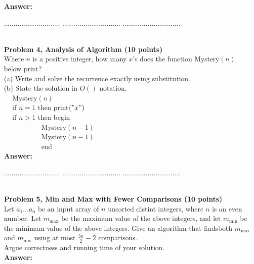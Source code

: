 \documentclass{article}
\begin{document}
\noindent
{\bf Answer:}

\pagebreak
{} $.............................$
 $..............................$
          $..............................$

\noindent
{}\\


\medskip\noindent
{\bf Problem 4, Analysis of Algorithm (10 points)}\\
Where $n$ is a positive integer,  how many $x$'s does the function Mystery$(n)$ below print?\\
(a) Write and solve the recurrence exactly using substitution.\\
(b) State the solution in $O()$ notation. \\
$~~~~$ Mystery$(n)$\\
$~~~~$ if $n=1$ then  print$("x")$\\
$~~~~$ if $n>1 $ then begin\\
$~~~~~~~~~~~~~~~~~~~~~~~$ Mystery$\left(  n-1  \right)$\\
$~~~~~~~~~~~~~~~~~~~~~~~$ Mystery$\left(  n-1  \right)$\\
$~~~~~~~~~~~~~~~~~~~~~~~$ end\\

\noindent
{\bf Answer:}

\pagebreak
{} $.............................$
 $..............................$
          $..............................$

\noindent
{}\\


\medskip\noindent
{\bf Problem 5, Min and Max with Fewer Comparisons (10 points)}\\
Let $a_1 \ldots a_n$ be an input array of $n$ unsorted distint integers, where $n$ is an even number.
Let $m_{\max}$ be the maximum value of the above integers, and 
let $m_{\min}$ be the minimum value of the above integers.
Give an  algorithm that findsboth $m_{\max}$ and $m_{\min}$ using at most $\frac{3n}{2}\! - \! 2$ comparisons.\\
Argue correctness and running time of your solution.\\

\noindent
{\bf Answer:}
\end{document}

